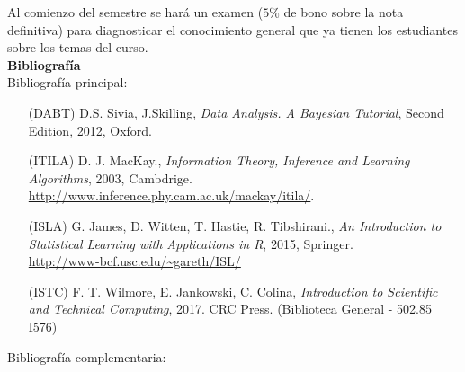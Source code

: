 \documentclass[letterpaper,10pt,onecolumn]{article}
\begin{document}
Al comienzo del semestre se har\'a un examen ($5\%$ de bono
sobre la nota definitiva) para diagnosticar el conocimiento general
que ya tienen los estudiantes sobre los temas del curso. 
\\[0.1cm]



\newpage
{}
\noindent\textbf{\large {} \quad
  Bibliograf\'ia}\\[-0.2cm] 


\noindent\normalsize Bibliograf\'ia principal:

\begin{itemize}
\item [(DABT)] D.S. Sivia, J.Skilling, \textit{Data Analysis. A Bayesian Tutorial}, Second Edition, 2012, Oxford.\\[-0.6cm]
\item [(ITILA)] D. J. MacKay., \textit{Information Theory, Inference and
  Learning Algorithms}, 2003,
  Cambdrige. \\
  \url{http://www.inference.phy.cam.ac.uk/mackay/itila/}.
  \\[-0.6cm]  
\item [(ISLA)] G. James, D. Witten, T. Hastie, R. Tibshirani., \textit{An
  Introduction to Statistical Learning with Applications in R}, 2015,
  Springer. \\
  \url{http://www-bcf.usc.edu/~gareth/ISL/} \\[-0.6cm] 
\item [(ISTC)] F. T. Wilmore, E. Jankowski, C. Colina, \textit{Introduction
  to Scientific and Technical Computing}, 2017. CRC Press. (Biblioteca
  General - 502.85 I576)\\[-0.6cm] 

\end{itemize} 

\noindent\normalsize Bibliograf\'ia complementaria:
\end{document}
